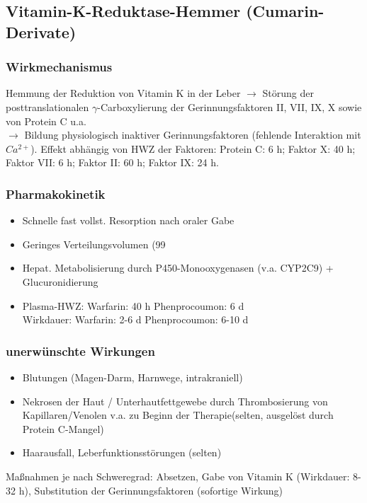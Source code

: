 \documentclass[10pt,a4paper]{report}
\begin{document}
\subsection{Vitamin-K-Reduktase-Hemmer (Cumarin-Derivate)} %
\label{ssub:vitamin_k_reduktase_hemmer_}
\subsubsection{Wirkmechanismus} %
\label{par:wirkmechanismus}
Hemmung der Reduktion von Vitamin K in der Leber $\rightarrow$ Störung der posttranslationalen $\gamma$-Carboxylierung der Gerinnungsfaktoren II, VII, IX, X sowie von Protein C u.a. \\
$\rightarrow$ Bildung physiologisch inaktiver Gerinnungsfaktoren (fehlende Interaktion mit $Ca^{2+}$). Effekt abhängig von HWZ der Faktoren: Protein C: 6 h; Faktor X: 40 h; Faktor VII: 6 h;
Faktor II: 60 h; Faktor IX: 24 h.
\subsubsection{Pharmakokinetik} %
\label{par:pharmakokinetik}
\begin{itemize}
	\item Schnelle fast vollst. Resorption nach oraler Gabe
	\item Geringes Verteilungsvolumen (99 %
	\item Hepat. Metabolisierung durch P450-Monooxygenasen (v.a. CYP2C9) + Glucuronidierung
	\item Plasma-HWZ: 	Warfarin: 40 h 	Phenprocoumon: 6 d \\Wirkdauer:		Warfarin: 2-6 d 	Phenprocoumon: 6-10 d
\end{itemize}
\subsubsection{unerwünschte Wirkungen} %
\label{par:unerw_nschte_wirkungen}
\begin{itemize}
	\item Blutungen (Magen-Darm, Harnwege, intrakraniell)
	\item Nekrosen der Haut / Unterhautfettgewebe durch Thrombosierung von Kapillaren/Venolen v.a. zu Beginn der Therapie(selten, ausgelöst durch Protein C-Mangel)
	\item Haarausfall, Leberfunktionsstörungen (selten)
\end{itemize}
Maßnahmen je nach Schweregrad: Absetzen, Gabe von Vitamin K (Wirkdauer: 8-32 h), Substitution der Gerinnungsfaktoren (sofortige Wirkung)
\end{document}
